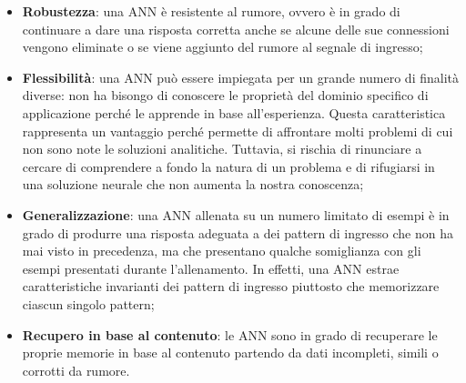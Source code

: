 \begin{itemize}
	\item \textbf{Robustezza}: una ANN è resistente al rumore, ovvero è in grado
	      di continuare a dare una risposta corretta anche se alcune delle sue
	      connessioni vengono eliminate o se viene aggiunto del rumore al
	      segnale di ingresso;

	\item \textbf{Flessibilità}: una ANN può essere impiegata per un grande
	      numero di finalità diverse: non ha bisongo di conoscere le proprietà
	      del dominio specifico di applicazione perché le apprende in base
	      all'esperienza. Questa caratteristica rappresenta un vantaggio perché
	      permette di affrontare molti problemi di cui non sono note le
	      soluzioni analitiche. Tuttavia, si rischia di rinunciare a cercare di
	      comprendere a fondo la natura di un problema e di rifugiarsi in una
	      soluzione neurale che non aumenta la nostra conoscenza;

	\item \textbf{Generalizzazione}: una ANN allenata su un numero limitato di
	      esempi è in grado di produrre una risposta adeguata a dei pattern di
	      ingresso che non ha mai visto in precedenza, ma che presentano qualche
	      somiglianza con gli esempi presentati durante l'allenamento. In
	      effetti, una ANN estrae caratteristiche invarianti dei pattern di
	      ingresso piuttosto che memorizzare ciascun singolo pattern;

	\item \textbf{Recupero in base al contenuto}: le ANN sono in grado di
	      recuperare le proprie memorie in base al contenuto partendo da dati
	      incompleti, simili o corrotti da rumore.
\end{itemize}
